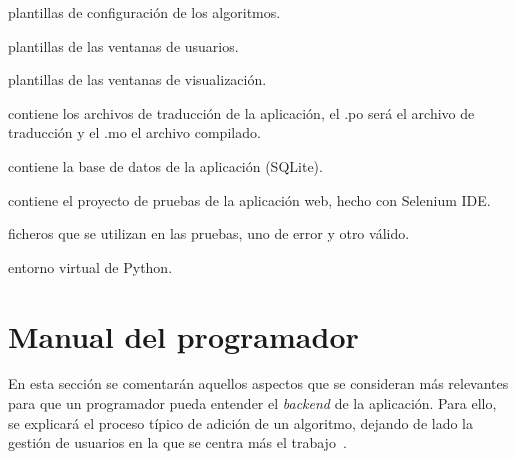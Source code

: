 \begin{description}[style=nextline, labelindent=0pt, itemsep=1ex]
\begin{description}[style=nextline, labelindent=0pt, itemsep=1ex]
\begin{description}[style=nextline, labelindent=0pt, itemsep=1ex]
\begin{description}[style=nextline, labelindent=0pt, itemsep=1ex]
\begin{description}[style=nextline, labelindent=0pt, itemsep=1ex]
                                    \item[configuracion/:] plantillas de configuración de los algoritmos.
                                    \item[usuarios/:] plantillas de las ventanas de usuarios.
                                    \item[visualizacion/:] plantillas de las ventanas de visualización.
                                \end{description}
                        \end{description}
                    \item[translations/:]
                        \begin{description}[style=nextline, labelindent=0pt, itemsep=1ex]
                            \item[es/:]
                                \begin{description}[style=nextline, labelindent=0pt, itemsep=1ex]
                                    \item[LC\_MESSAGES/:] contiene los archivos de traducción de la aplicación, el .po será el archivo de traducción y el .mo el archivo compilado.
                                \end{description}
                        \end{description}
                    \item[instance:] contiene la base de datos de la aplicación (SQLite).
                    \item[tests:] contiene el proyecto de pruebas de la aplicación web, hecho con Selenium IDE.
                        \begin{description}[style=nextline, labelindent=0pt, itemsep=1ex]
                            \item[ficheros:] ficheros que se utilizan en las pruebas, uno de error y otro válido.
                        \end{description}
                \end{description}
            \item[venv/:] entorno virtual de Python.
        \end{description}
\end{description}
	
\section{Manual del programador}
En esta sección se comentarán aquellos aspectos que se consideran más relevantes para que un programador pueda entender el \textit{backend} de la aplicación. Para ello, se explicará el proceso típico de adición de un algoritmo, dejando de lado la gestión de usuarios en la que se centra más el trabajo~\cite{TFG:David}. 

